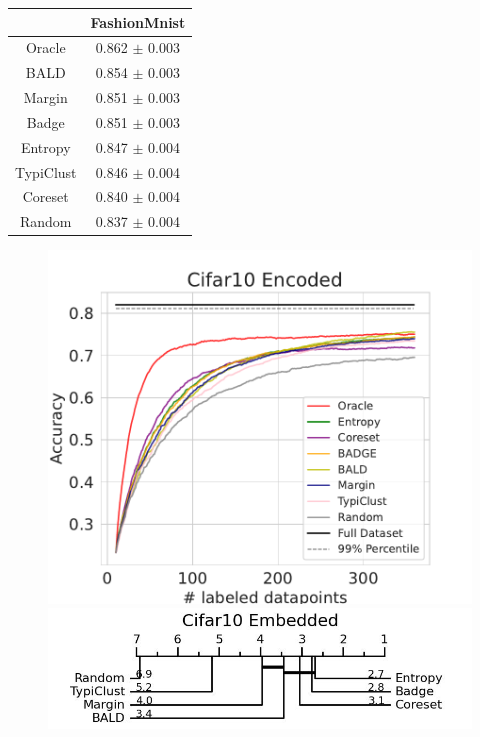 \documentclass[]{article}
\begin{document}
\begin{minipage}{0.29\linewidth}
\begin{tabular}{c|c}
&FashionMnist\\
\hline
Oracle&0.862 $\pm$ 0.003\\
BALD&0.854 $\pm$ 0.003\\
Margin&0.851 $\pm$ 0.003\\
Badge&0.851 $\pm$ 0.003\\
Entropy&0.847 $\pm$ 0.004\\
TypiClust&0.846 $\pm$ 0.004\\
Coreset&0.840 $\pm$ 0.004\\
Random&0.837 $\pm$ 0.004\\
\end{tabular}
\end{minipage}
\begin{minipage}{0.65\linewidth}
\begin{figure}[H]
    \centering
    \includegraphics[width=\linewidth]{img/eval_cifar10_enc} \\ [2mm]
    \includegraphics[width=\linewidth]{img/micro_cifar10_enc.jpg} 
\end{figure}
\end{minipage}
\end{document}
